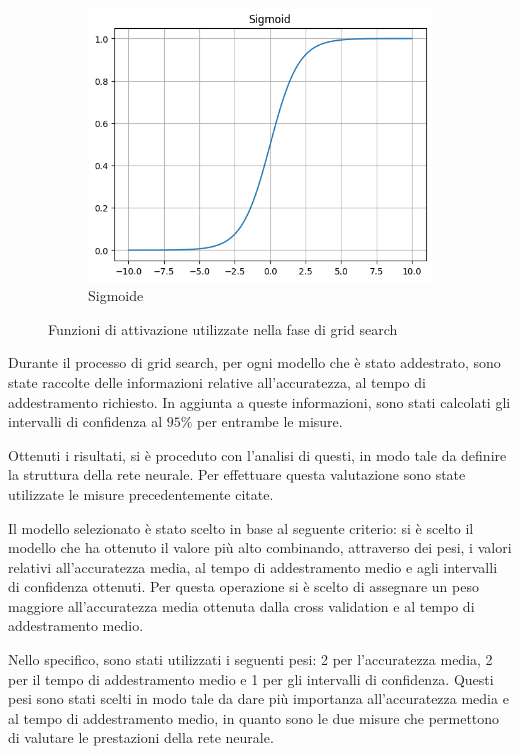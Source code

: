 \begin{figure}[!ht]
    \hfill
    \begin{subfigure}[b]{0.3\textwidth}
        \centering
        \includegraphics[width=\textwidth]{img/rete/sigmoid.png}
        \caption{Sigmoide}
        \label{fig:sigmoid}
    \end{subfigure}
    \caption{Funzioni di attivazione utilizzate nella fase di grid search}
    \label{fig:}
\end{figure}

Durante il processo di grid search, per ogni modello che è stato addestrato, sono
state raccolte delle informazioni relative all'accuratezza, al tempo di addestramento
richiesto. In aggiunta a queste informazioni, sono stati calcolati gli intervalli
di confidenza al $95\%$ per entrambe le misure.

Ottenuti i risultati, si è proceduto con l'analisi di questi, in modo tale da
definire la struttura della rete neurale. Per effettuare questa valutazione sono
state utilizzate le misure precedentemente citate.

Il modello selezionato è stato scelto in base al seguente criterio: si è scelto
il modello che ha ottenuto il valore più alto combinando, attraverso dei pesi,
i valori relativi all'accuratezza media, al tempo di addestramento medio e
agli intervalli di confidenza ottenuti. Per questa operazione si è scelto di 
assegnare un peso maggiore all'accuratezza media ottenuta dalla cross validation 
e al tempo di addestramento medio.

Nello specifico, sono stati utilizzati i seguenti pesi: 2 per l'accuratezza
media, 2 per il tempo di addestramento medio e 1 per gli intervalli di
confidenza. Questi pesi sono stati scelti in modo tale da dare più importanza
all'accuratezza media e al tempo di addestramento medio, in quanto sono le due
misure che permettono di valutare le prestazioni della rete neurale.

